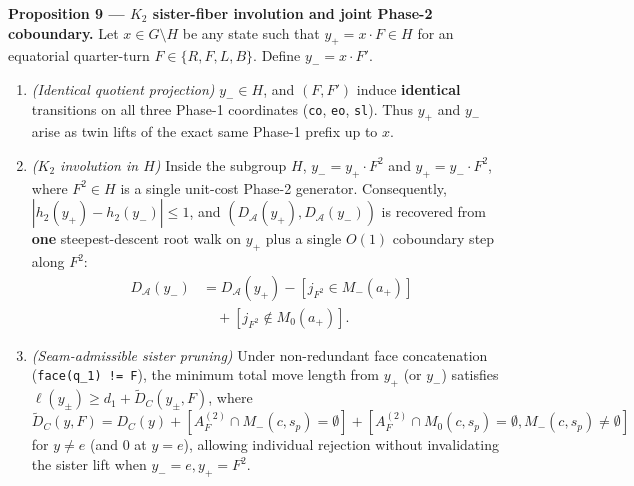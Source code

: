 \documentclass[10pt,twocolumn,letterpaper]{article}
\providecommand{\tightlist}{\setlength{\itemsep}{0pt}\setlength{\parskip}{0pt}}
\begin{document}
\textbf{Proposition 9 --- \(K_2\) sister-fiber involution and joint
Phase-2 coboundary.} Let \(x \in G \setminus H\) be any state such that
\(y_+ = x \cdot F \in H\) for an equatorial quarter-turn
\(F \in \{R, F, L, B\}\). Define \(y_- = x \cdot F'\).

\begin{enumerate}
\def\labelenumi{\arabic{enumi}.}
\tightlist
\item
  \emph{(Identical quotient projection)} \(y_- \in H\), and \((F, F')\)
  induce \textbf{identical} transitions on all three Phase-1 coordinates
  (\texttt{co}, \texttt{eo}, \texttt{sl}). Thus \(y_+\) and \(y_-\)
  arise as twin lifts of the exact same Phase-1 prefix up to \(x\).
\item
  \emph{(\(K_2\) involution in \(H\))} Inside the subgroup \(H\),
  \(y_- = y_+ \cdot F^2\) and \(y_+ = y_- \cdot F^2\), where
  \(F^2 \in H\) is a single unit-cost Phase-2 generator. Consequently,
  \(|h_2(y_+) - h_2(y_-)| \le 1\), and
  \((D_{\mathcal A}(y_+), D_{\mathcal A}(y_-))\) is recovered from
  \textbf{one} steepest-descent root walk on \(y_+\) plus a single
  \(O(1)\) coboundary step along \(F^2\): \[
  \begin{aligned}
  D_{\mathcal A}(y_-) &= D_{\mathcal A}(y_+) - [j_{F^2} \in M_-(a_+)]\\
  &\quad + [j_{F^2} \notin M_0(a_+)].
  \end{aligned}
  \tag{13}
  \]
\item
  \emph{(Seam-admissible sister pruning)} Under non-redundant face
  concatenation (\texttt{face(q\_1)\ !=\ F}), the minimum total move
  length from \(y_+\) (or \(y_-\)) satisfies
  \(\ell(y_\pm) \ge d_1 + \tilde D_C(y_\pm, F)\), where
  \(\tilde D_C(y, F) = D_C(y) + [A_F^{(2)} \cap M_-(c, s_p) = \emptyset] + [A_F^{(2)} \cap M_0(c, s_p) = \emptyset, M_-(c, s_p) \ne \emptyset]\)
  for \(y \ne e\) (and \(0\) at \(y=e\)), allowing individual rejection
  without invalidating the sister lift when \(y_- = e, y_+ = F^2\).
\end{enumerate}
\end{document}
